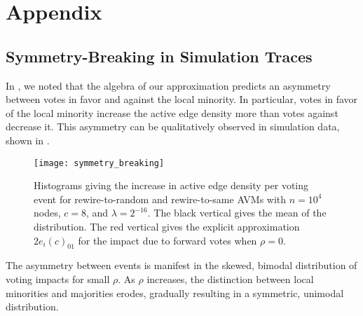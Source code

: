 \documentclass[review, onefignum, onetabnum]{siamart171218}
\begin{document}


{}

\section{Appendix}

    \subsection{Symmetry-Breaking in Simulation Traces} \label{sec:symmetry_breaking}
        In , we noted that the algebra of our approximation predicts an asymmetry between votes in favor and against the local minority.
        In particular, votes in favor of the local minority increase the active edge density more than votes against decrease it. 
        This asymmetry can be qualitatively observed in simulation data, shown in . 
        \begin{figure}
			\centering
				\texttt{[image: symmetry\_breaking]}
			\caption{Histograms giving the increase in active edge density per voting event for rewire-to-random and rewire-to-same AVMs with $n = 10^4$ nodes, $c = 8$, and $\lambda = 2^{-16}$. The black vertical gives the mean of the distribution. The red vertical gives the explicit approximation $2e_i(c)_{01}$ for the impact due to forward votes when $\rho = 0$.}
			\label{fig:symmetry_breaking}
		\end{figure}
		The asymmetry between events is manifest in the skewed, bimodal distribution of voting impacts for small $\rho$. 
		As $\rho$ increases, the distinction between local minorities and majorities erodes, gradually resulting in a symmetric, unimodal distribution. 
        
\end{document}
